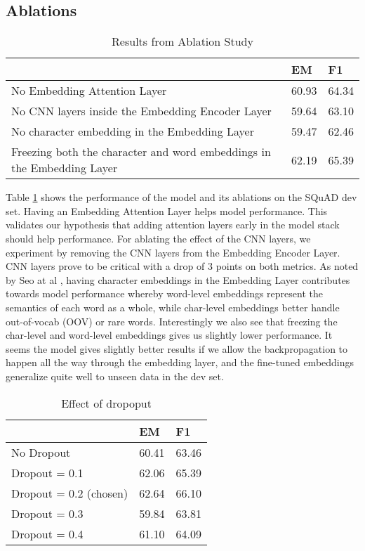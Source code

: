 \subsection{Ablations}
\label{subsec:ablations}


\begin{table}[]
\caption{Results from Ablation Study}
\label{table:ablation}
\centering
\begin{tabular}{lll}
                                                                       & EM    & F1    \\ \hline
No Embedding Attention Layer                                           & 60.93 & 64.34 \\
No CNN layers inside the Embedding Encoder Layer                       & 59.64 & 63.10 \\
No character embedding in the Embedding Layer                          & 59.47 & 62.46 \\
Freezing both the character and word embeddings in the Embedding Layer & 62.19 & 65.39 \\ \hline

\end{tabular}
\end{table}


Table \ref{table:ablation} shows the performance of the model and its ablations on the SQuAD dev set. Having an Embedding Attention Layer helps model performance. This validates our hypothesis that adding attention layers early in the model stack should help performance. For ablating the effect of the CNN layers, we experiment by removing the CNN layers from the Embedding Encoder Layer. CNN layers prove to be critical with a drop of 3 points on both metrics. As noted by Seo at al \cite{seo2016bidirectional}, having character embeddings in the Embedding Layer contributes towards model performance whereby word-level embeddings represent the semantics of each word as a whole, while char-level embeddings better handle out-of-vocab (OOV) or rare words. Interestingly we also see that freezing the char-level and word-level embeddings gives us slightly lower performance. It seems the model gives slightly better results if we allow the backpropagation to happen all the way through the embedding layer, and the fine-tuned embeddings generalize quite well to unseen data in the dev set. 

\begin{table}[]
\caption{Effect of dropoput}
\label{table:dropoutresults}
\centering
\begin{tabular}{lll}
																	& EM    & F1    \\ \hline
No Dropout		   									& 60.41 & 63.46 \\
Dropout = 0.1    									& 62.06 & 65.39 \\ 
Dropout = 0.2 (chosen)		  			& 62.64 & 66.10 \\ 
Dropout = 0.3    									& 59.84 & 63.81 \\ 
Dropout = 0.4    									& 61.10 & 64.09 \\ \hline

\end{tabular}
\end{table}

